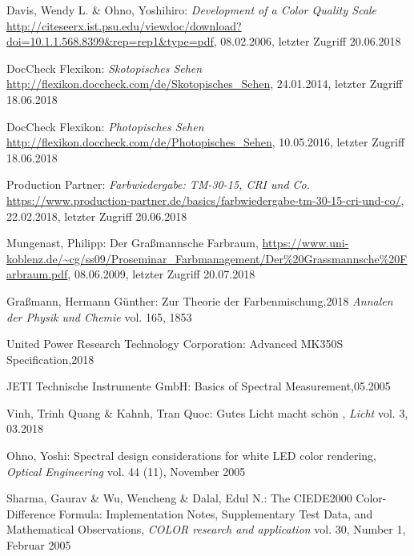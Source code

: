 \begin{thebibliography}{}
Davis, Wendy L. \& Ohno, Yoshihiro:
\emph{\glqq Development of a Color Quality Scale\grqq}
\url{http://citeseerx.ist.psu.edu/viewdoc/download?doi=10.1.1.568.8399&rep=rep1&type=pdf}, 08.02.2006, letzter Zugriff 20.06.2018

DocCheck Flexikon:
\emph{\glqq Skotopisches Sehen\grqq}
\url{http://flexikon.doccheck.com/de/Skotopisches_Sehen}, 24.01.2014, letzter Zugriff 18.06.2018

DocCheck Flexikon:
\emph{\glqq Photopisches Sehen\grqq}
\url{http://flexikon.doccheck.com/de/Photopisches_Sehen}, 10.05.2016, letzter Zugriff 18.06.2018

Production Partner:
\emph{\glqq Farbwiedergabe: TM-30-15, CRI und Co.\grqq}
\url{https://www.production-partner.de/basics/farbwiedergabe-tm-30-15-cri-und-co/}, 22.02.2018, letzter Zugriff 20.06.2018


Mungenast, Philipp:
\glqq Der Graßmannsche Farbraum\grqq ,
\url{https://www.uni-koblenz.de/~cg/ss09/Proseminar_Farbmanagement/Der\%20Grassmannsche\%20Farbraum.pdf}, 08.06.2009, letzter Zugriff 20.07.2018


Graßmann, Hermann Günther:
\glqq Zur Theorie der Farbenmischung\grqq ,2018
\emph{Annalen der Physik und Chemie} vol. 165, 1853

United Power Research Technology Corporation:
\glqq Advanced MK350S Specification\grqq ,2018


JETI Technische Instrumente GmbH:
\glqq Basics of Spectral Measurement\grqq ,05.2005

Vinh, Trinh Quang \& Kahnh, Tran Quoc:
\glqq Gutes Licht macht schön \grqq, 
\emph{Licht} vol. 3, 03.2018

Ohno, Yoshi:
\glqq Spectral design considerations for white LED color rendering\grqq, 
\emph{Optical Engineering} vol. 44 (11), November 2005

Sharma, Gaurav \& Wu, Wencheng \& Dalal, Edul N.:
\glqq The CIEDE2000 Color-Difference Formula: Implementation Notes, Supplementary Test Data, and Mathematical Observations\grqq,
\emph{COLOR research and application} vol. 30, Number 1, Februar 2005


\end{thebibliography}
